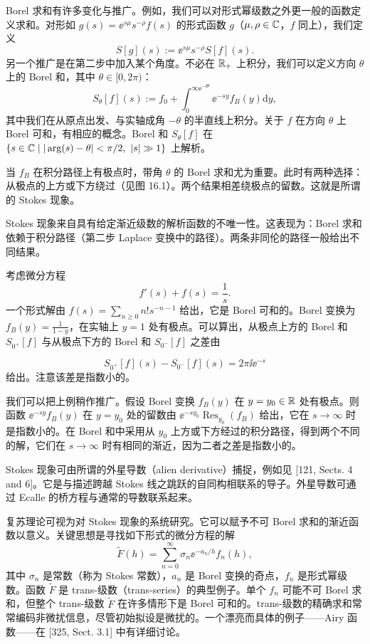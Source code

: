 Borel 求和有许多变化与推广。例如，我们可以对形式幂级数之外更一般的函数定义求和。对形如 $g(s)=\ee^{s\mu}s^{-\rho}f(s)$ 的形式函数 $g$（$\mu,\rho\in\mathbb{C}$，$f$ 同上），我们定义
\begin{equation}
S[g](s):=\ee^{s\mu}s^{-\rho}S[f](s).
\tag{16.20}
\end{equation}
另一个推广是在第二步中加入某个角度。不必在 $\mathbb{R}_+$ 上积分，我们可以定义方向 $\theta$ 上的 Borel 和，其中 $\theta\in[0,2\pi)$：
\[
S_\theta[f](s):=f_0+\int_0^{\infty\ee^{-\ii\theta}}\ee^{-sy}f_B(y)\mathrm{d}y,
\]
其中我们在从原点出发、与实轴成角 $-\theta$ 的半直线上积分。关于 $f$ 在方向 $\theta$ 上 Borel 可和，有相应的概念。Borel 和 $S_\theta[f]$ 在 $\{s\in\C\mid|\arg(s)-\theta|<\pi/2,\ |s|\gg1\}$ 上解析。

当 $f_B$ 在积分路径上有极点时，带角 $\theta$ 的 Borel 求和尤为重要。此时有两种选择：从极点的上方或下方绕过（见图 16.1）。两个结果相差绕极点的留数。这就是所谓的 Stokes 现象。


Stokes 现象来自具有给定渐近级数的解析函数的不唯一性。这表现为：Borel 求和依赖于积分路径（第二步 Laplace 变换中的路径）。两条非同伦的路径一般给出不同结果。

\begin{example}[16.16] 考虑微分方程
\[
f'(s)+f(s)=\frac1s.
\]
一个形式解由 $f(s)=\sum_{n\ge0}n!s^{-n-1}$ 给出，它是 Borel 可和的。Borel 变换为 $f_B(y)=\frac{1}{1-y}$，在实轴上 $y=1$ 处有极点。可以算出，从极点上方的 Borel 和 $S_{0^+}[f]$ 与从极点下方的 Borel 和 $S_{0^-}[f]$ 之差由

\[
S_{0^+}[f](s)-S_{0^-}[f](s)=2\pi\ii\ee^{-s}
\]
给出。注意该差是指数小的。\end{example}

我们可以把上例稍作推广。假设 Borel 变换 $f_B(y)$ 在 $y=y_0\in\mathbb{R}$ 处有极点。则函数 $\ee^{-sy}f_B(y)$ 在 $y=y_0$ 处的留数由 $\ee^{-sy_0}\operatorname{Res}_{y_0}(f_B)$ 给出，它在 $s\to\infty$ 时是指数小的。在 Borel 和中采用从 $y_0$ 上方或下方经过的积分路径，得到两个不同的解，它们在 $s\to\infty$ 时有相同的渐近，因为二者之差是指数小的。

\begin{remark}[16.17] Stokes 现象可由所谓的外星导数（alien derivative）捕捉，例如见 [121, Sects. 4 and 6]。它是与描述跨越 Stokes 线之跳跃的自同构相联系的导子。外星导数可通过 Ecalle 的桥方程与通常的导数联系起来。

复苏理论可视为对 Stokes 现象的系统研究。它可以赋予不可 Borel 求和的渐近函数以意义。关键思想是寻找如下形式的微分方程的解
\[
\tilde F(h)=\sum_{n=0}^\infty\sigma_n\ee^{-a_n/h}f_n(h),
\]
其中 $\sigma_n$ 是常数（称为 Stokes 常数），$a_n$ 是 Borel 变换的奇点，$f_n$ 是形式幂级数。函数 $\tilde F$ 是 trans-级数（trans-series）的典型例子。单个 $f_n$ 可能不可 Borel 求和，但整个 trans-级数 $\tilde F$ 在许多情形下是 Borel 可和的。trans-级数的精确求和常常编码非微扰信息，尽管初始拟设是微扰的。一个漂亮而具体的例子——Airy 函数——在 [325, Sect. 3.1] 中有详细讨论。\end{remark}

